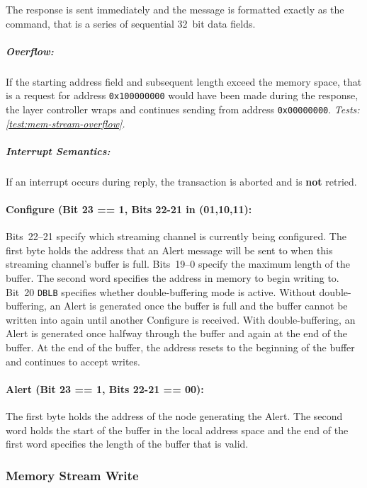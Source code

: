 The response is sent immediately and the message is formatted exactly as the
 command, that is a series of sequential 32~bit
data fields.

\subparagraph{Overflow:} If the starting address field and subsequent length
exceed the memory space, that is a request for address {\tt 0x100000000} would
have been made during the response, the layer controller wraps and continues
sending from address {\tt 0x00000000}.
{\em Tests: \ref{test:mem-stream-overflow}.}

\subparagraph{Interrupt Semantics:} If an interrupt occurs during reply, the
transaction is aborted and is {\bf not} retried.

\paragraph{Configure (Bit 23 == 1, Bits 22-21 in (01,10,11):}
\label{cmd:mem-stream-multi-conf}
Bits~22--21 specify which streaming channel is currently being configured.
The first byte holds the \bus address that an Alert message will be sent to
when this streaming channel's buffer is full.
Bits~19--0 specify the maximum length of the buffer.
The second word specifies the address in memory to begin writing to.
Bit~20 {\tt DBLB} specifies whether double-buffering mode is active. Without
double-buffering, an Alert is generated once the buffer is full and the buffer
cannot be written into again until another Configure is received. With
double-buffering, an Alert is generated once halfway through the buffer and
again at the end of the buffer. At the end of the buffer, the address resets
to the beginning of the buffer and continues to accept writes.

\paragraph{Alert (Bit 23 == 1, Bits 22-21 == 00):}
\label{cmd:mem-stream-multi-alert}
The first byte holds the address of the node generating the Alert.
The second word holds the start of the buffer in the local address space and
the end of the first word specifies the length of the buffer that is valid.


\subsubsection{Memory Stream Write}
\label{cmd:mem-stream-write}

